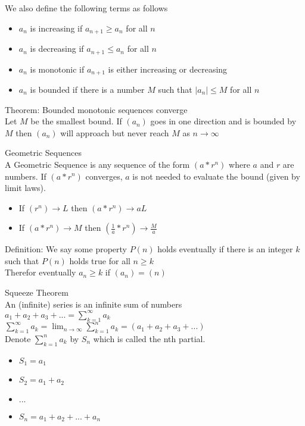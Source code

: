 \documentclass{article}
\begin{document}
We also define the following terms as follows
\begin{itemize}
  \item $a_n$ is increasing if $a_{n+1} \geq a_n$ for all $n$
  \item $a_n$ is decreasing if $a_{n+1} \leq a_n$ for all $n$
  \item $a_n$ is monotonic if $a_{n+1}$ is either increasing or decreasing
  \item $a_n$ is bounded if there is a number $M$ such that $|a_n| \leq M$ for all $n$
\end{itemize}

Theorem: Bounded monotonic sequences converge\\
Let $M$ be the smallest bound. If $(a_n)$ goes in one direction and is bounded by $M$ then $(a_n)$ will approach but never reach $M$ as $n \to \infty$

\noindent
\Large
Geometric Sequences\\
\normalsize
\indent
A Geometric Sequence is any sequence of the form $(a * r^n)$ where $a$ and $r$ are numbers. If $(a * r^n)$ converges, $a$ is not needed to evaluate the bound (given by limit laws).
\begin{itemize}
  \item If $(r^n) \to L$ then $(a * r^n) \to aL$
  \item If $(a* r^n) \to M$ then $(\frac{1}{a} * r^n) \to \frac{M}{a}$
\end{itemize}

Definition: We say some property $P(n)$ holds eventually if there is an integer $k$ such that $P(n)$ holds true for all $n \geq k$\\
Therefor eventually $a_n \geq k$ if $(a_n) = (n)$

\noindent
\Large
Squeeze Theorem\\
\normalsize
\indent
An (infinite) series is an infinite sum of numbers\\
$a_1 + a_2 + a_3 + ... = \sum_{k=1}^{\infty} a_k$\\
$\sum_{k=1}^{\infty} a_k = \lim_{n \to \infty}\sum_{k=1}^{n} a_k = (a_1 + a_2 + a_3 + ...)$\\
Denote $\sum_{k=1}^{n} a_k$ by $S_n$ which is called the nth partial.
\begin{itemize}
  \item $S_1 = a_1$
  \item $S_2 = a_1 + a_2$
  \item $...$
  \item $S_n = a_1 + a_2 + ... + a_n$
\end{itemize}
\end{document}
